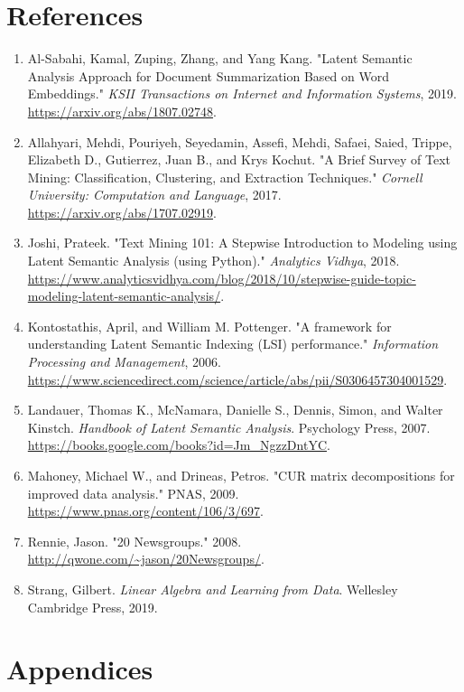 \documentclass{article}
\begin{document}
\newpage
\section{References}
\begin{enumerate}
    \item Al-Sabahi, Kamal, Zuping, Zhang, and Yang Kang. "Latent Semantic Analysis Approach for Document Summarization Based on Word Embeddings." \textit{KSII Transactions on Internet and Information Systems}, 2019. \url{https://arxiv.org/abs/1807.02748}.
    \item Allahyari, Mehdi, Pouriyeh, Seyedamin, Assefi, Mehdi, Safaei, Saied, Trippe,  Elizabeth D., Gutierrez, Juan B., and Krys Kochut. "A Brief Survey of Text Mining: Classification, Clustering, and Extraction Techniques." \textit{Cornell University: Computation and Language}, 2017. \url{https://arxiv.org/abs/1707.02919}.
    \item Joshi, Prateek. "Text Mining 101: A Stepwise Introduction to Modeling using Latent Semantic Analysis (using Python)." \textit{Analytics Vidhya}, 2018. \url{https://www.analyticsvidhya.com/blog/2018/10/stepwise-guide-topic-modeling-latent-semantic-analysis/}.
    \item Kontostathis, April, and William M. Pottenger. "A framework for understanding Latent Semantic Indexing (LSI) performance." \textit{Information Processing and Management}, 2006. \url{https://www.sciencedirect.com/science/article/abs/pii/S0306457304001529}.
    \item Landauer, Thomas K., McNamara, Danielle S., Dennis, Simon, and Walter Kinstch. \textit{Handbook of Latent Semantic Analysis}. Psychology Press, 2007. \url{https://books.google.com/books?id=Jm_NgzzDntYC}.
    \item Mahoney, Michael W., and Drineas, Petros. "CUR matrix decompositions for improved data analysis." PNAS, 2009. \url{https://www.pnas.org/content/106/3/697}.
    \item Rennie, Jason. "20 Newsgroups." 2008. \url{http://qwone.com/~jason/20Newsgroups/}.
    \item Strang, Gilbert. \textit{Linear Algebra and Learning from Data}. Wellesley Cambridge Press, 2019.

\end{enumerate}

\newpage
\section{Appendices}
\end{document}
